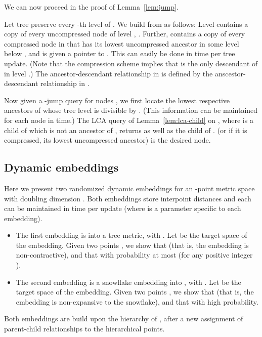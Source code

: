 \documentclass[11pt]{article}
\newenvironment{proof}{{\bf Proof:\ }}{\hfill\medskip}
\begin{document}
We can now proceed in the proof of Lemma~\ref{lem:jump}.

\begin{proof}
Let tree  preserve every -th level of . We build  from  as follows: Level
 contains a copy of every uncompressed node of level ,
. Further,  contains a copy of every compressed node  in  that has its lowest uncompressed ancestor  in some level below , and  is given a pointer to . This can easily be done in  time per
tree update. (Note that the compression scheme implies that  is the only descendant of
 in level .) The ancestor-descendant relationship in  is defined by
the anscestor-descendant relationship in .

Now given a -jump query for nodes , we first locate the lowest respective
ancestors  of  whose tree level is divisible by . (This information can be
maintained for each node in  time.) The LCA query of Lemma~\ref{lem:lca-child} on
, where  is a child of  which is not an ancestor of , returns  as well as the child  of .  (or if it
is compressed, its lowest uncompressed ancestor) is the desired node.
\end{proof}



\subsection{Dynamic embeddings}\label{sec:dyn-embed}

Here we present two randomized dynamic embeddings for an -point metric space 
with doubling dimension . Both embeddings store  interpoint distances
and each can be maintained in time
 per update (where 
is a parameter specific to each embedding).
\begin{itemize}
\item
The first embedding is into a tree metric, with . Let  be the target space
of the embedding. Given two points , we show that  (that is,
the embedding is non-contractive), and that  with
probability at most  (for any positive integer ).
\item
The second embedding is a snowflake embedding into , with . Let  be the
target space of the embedding. Given two points , we show that
 (that is, the embedding is non-expansive to
the snowflake), and that 
with high probability.
\end{itemize}

Both embeddings are build upon the hierarchy of \cite{CoGo06}, after a new
assignment of parent-child relationships to the hierarchical points.
\end{document}
